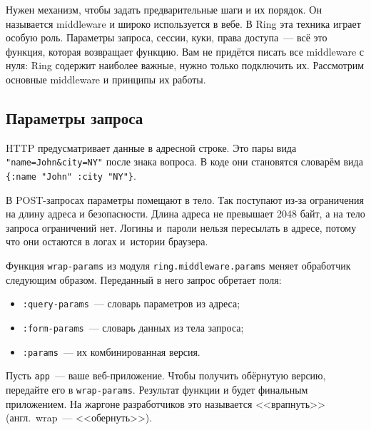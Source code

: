 Нужен механизм, чтобы задать предварительные шаги и их порядок. Он называется
middleware и широко используется в вебе. В Ring эта техника играет особую
роль. Параметры запроса, сессии, куки, права доступа~--- всё это функция,
которая возвращает функцию. Вам не придётся писать все middleware с нуля: Ring
содержит наиболее важные, нужно только подключить их. Рассмотрим основные
middleware и принципы их работы.

\subsection{Параметры запроса}

\label{ring-params}


HTTP предусматривает данные в адресной строке. Это пары вида
\verb|"name=John&city=NY"| после знака вопроса. В коде они становятся
словарём вида \verb|{:name "John" :city "NY"}|.

В POST-запросах параметры помещают в тело. Так поступают из-за ограничения на
длину адреса и безопасности. Длина адреса не превышает 2048 байт, а на тело
запроса ограничений нет. Логины и~пароли нельзя пересылать в адресе, потому что
они остаются в логах и~истории браузера.


\mnoindent
Функция \verb|wrap-params| из модуля \texttt{ring.middle\-ware.params} меняет
обработчик следующим образом. Переданный в него запрос обретает поля:

\begin{itemize}

\item
  \verb|:query-params|~--- словарь параметров из адреса;

\item
  \verb|:form-params|~--- словарь данных из тела запроса;

\item
  \verb|:params|~--- их комбинированная версия.

\end{itemize}

Пусть \verb|app|~--- ваше веб-приложение. Чтобы получить обёрнутую версию,
передайте его в \verb|wrap-params|. Результат функции и будет финальным
приложением. На жаргоне разработчиков это называется <<врапнуть>>
(англ.~wrap~--- <<обернуть>>).


